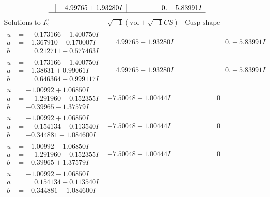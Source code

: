 \documentclass[1p]{elsarticle_modified}
\theoremstyle{definition}
\newcommand{\I}{\sqrt{-1}}
\begin{document}
$$\begin{array}{c|c|c}
 & \phantom{-}4.99765 + 1.93280 I & \phantom{-0.000000 } 0. - 5.83991 I\\
 \hline 
 \end{array}$$\newpage$$\begin{array}{c|c|c}  
\text{Solutions to }I^u_{2}& \I (\text{vol} + \sqrt{-1}CS) & \text{Cusp shape}\\
 \hline 
\begin{aligned}
u &= \phantom{-}0.173166 - 1.400750 I \\
a &= -1.367910 + 0.170007 I \\
b &= \phantom{-}0.212711 + 0.577463 I\end{aligned}
 & \phantom{-}4.99765 - 1.93280 I & \phantom{-0.000000 -}0. + 5.83991 I \\ \hline\begin{aligned}
u &= \phantom{-}0.173166 - 1.400750 I \\
a &= -1.38631 + 0.99061 I \\
b &= \phantom{-}0.646364 - 0.999117 I\end{aligned}
 & \phantom{-}4.99765 - 1.93280 I & \phantom{-0.000000 -}0. + 5.83991 I \\ \hline\begin{aligned}
u &= -1.00992 + 1.06850 I \\
a &= \phantom{-}1.291960 + 0.152355 I \\
b &= -0.39965 - 1.37579 I\end{aligned}
 & -7.50048 + 1.00444 I & \phantom{-0.000000 } 0 \\ \hline\begin{aligned}
u &= -1.00992 + 1.06850 I \\
a &= \phantom{-}0.154134 + 0.113540 I \\
b &= -0.344881 + 1.084600 I\end{aligned}
 & -7.50048 + 1.00444 I & \phantom{-0.000000 } 0 \\ \hline\begin{aligned}
u &= -1.00992 - 1.06850 I \\
a &= \phantom{-}1.291960 - 0.152355 I \\
b &= -0.39965 + 1.37579 I\end{aligned}
 & -7.50048 - 1.00444 I & \phantom{-0.000000 } 0 \\ \hline\begin{aligned}
u &= -1.00992 - 1.06850 I \\
a &= \phantom{-}0.154134 - 0.113540 I \\
b &= -0.344881 - 1.084600 I\end{aligned}

\end{array}$$
\end{document}
